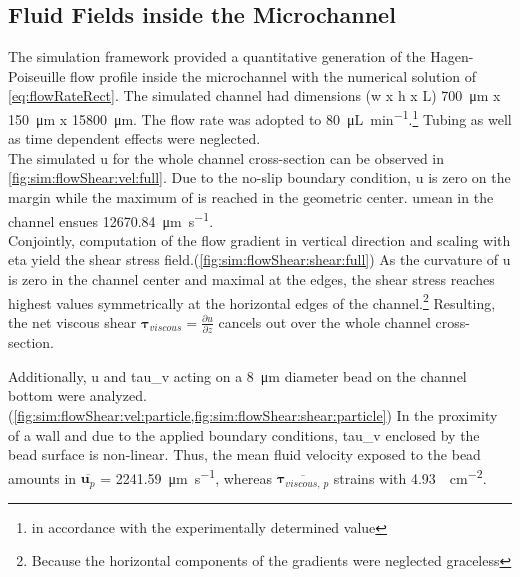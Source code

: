 
\subsection{Fluid Fields inside the Microchannel}
\label{sec:res:fluidSim}
The simulation framework provided a quantitative generation of the Hagen-Poiseuille flow profile inside the microchannel with the numerical solution of \cref{eq:flowRateRect}. The simulated channel had dimensions (w x h x L) \SI{700}{\micro\meter} x \SI{150}{\micro\meter} x \SI{15800}{\micro\meter}. The flow rate was adopted to \SI{80}{\micro\liter\per\minute}.\footnote{in accordance with the experimentally determined value} Tubing as well as time dependent effects were neglected. \\
The simulated \acrfull{u} for the whole channel cross-section can be observed in \cref{fig:sim:flowShear:vel:full}. Due to the no-slip boundary condition, \acrshort{u} is zero on the margin while the maximum of is reached in the geometric center. \Gls{umean} in the channel ensues \SI{12670.84}{\micro\meter\per\second}. \\
Conjointly, computation of the flow gradient in vertical direction and scaling with \gls{eta} yield the shear stress field.(\cref{fig:sim:flowShear:shear:full}) As the curvature of \gls{u} is zero in the channel center and maximal at the edges, the shear stress reaches highest values symmetrically at the horizontal edges of the channel.\footnote{Because the horizontal components of the gradients were neglected graceless} Resulting, the net viscous shear $\boldsymbol{\tau}_{viscous} = \frac{\partial u}{\partial z}$ cancels out over the whole channel cross-section.

Additionally, \gls{u} and \gls{tau_v} acting on a \SI{8}{\micro\meter} diameter bead on the channel bottom were analyzed.(\cref{fig:sim:flowShear:vel:particle,fig:sim:flowShear:shear:particle}) In the proximity of a wall and due to the applied boundary conditions, \gls{tau_v} enclosed by the bead surface is non-linear. Thus, the mean fluid velocity exposed to the bead amounts in $\overline{\mathbf{u}_{p}}$ =  \SI{2241.59}{\micro\meter\per\second}, whereas  $\overline{\boldsymbol{\tau}_{viscous,\, p}}$ strains with \SI{4.93}{\dyne\per\square\centi\meter}.

